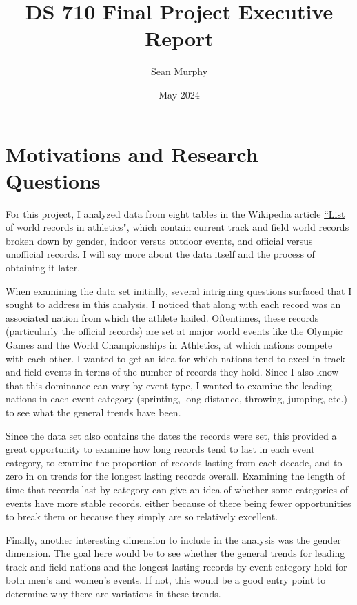\documentclass{article}
\title{DS 710 Final Project Executive Report}
\author{Sean Murphy}
\date{May 2024}
\begin{document}
\maketitle

\section{Motivations and Research Questions}


For this project, I analyzed data from eight tables in the Wikipedia article 
\href{https://en.wikipedia.org/wiki/List_of_world_records_in_athletics}{``List of world records in athletics"}, 
which contain current track and field world records broken down by gender, indoor versus outdoor events, and 
official versus unofficial records.  I will say more about the data itself and the process of obtaining it 
later.  

When examining the data set initially, several intriguing questions surfaced that I sought to address in this 
analysis.  I noticed that along with each record was an associated nation from which the athlete hailed.  
Oftentimes, these records (particularly the official records) are set at major world events like the Olympic 
Games and the World Championships in Athletics, at which nations compete with each other.  I wanted to get an 
idea for which nations tend to excel in track and field events in terms of the number of records they hold.  
Since I also know that this dominance can vary by event type, I wanted to examine the leading nations in each 
event category (sprinting, long distance, throwing, jumping, etc.) to see what the general trends have been.  

Since the data set also contains the dates the records were set, this provided a great opportunity to examine 
how long records tend to last in each event category, to examine the proportion of records lasting from each 
decade, and to zero in on trends for the longest lasting records overall.  Examining the length of time that 
records last by category can give an idea of whether some categories of events have more stable records, either 
because of there being fewer opportunities to break them or because they simply are so relatively excellent.

Finally, another interesting dimension to include in the analysis was the gender dimension.  The goal here 
would be to see whether the general trends for leading track and field nations and the longest lasting records 
by event category hold for both men's and women's events.  If not, this would be a good entry point to determine 
why there are variations in these trends.
\end{document}
